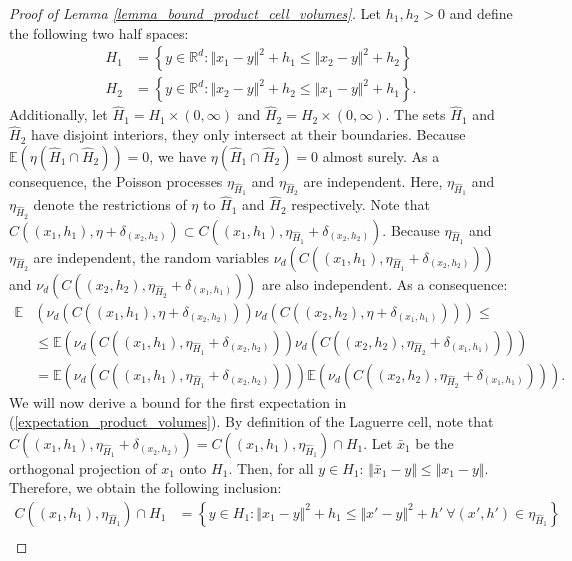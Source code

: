 \documentclass[10pt,a4paper]{amsart}
\newcommand{\EE}{\mathbb{E}}
\newcommand{\RR}{\mathbb{R}}
\begin{document}
\begin{proof}[Proof of Lemma \ref{lemma_bound_product_cell_volumes}]
    Let $h_1,h_2 > 0$ and define the following two half spaces:
    \begin{align*}
        H_1 &= \left\{y \in \RR^d: \Vert x_1 - y \Vert^2 + h_1 \leq \Vert x_2 - y\Vert^2 + h_2 \right\}\\
        H_2 &= \left\{y \in \RR^d: \Vert x_2 - y \Vert^2 + h_2 \leq \Vert x_1 - y\Vert^2 + h_1 \right\}.
    \end{align*}
    Additionally, let $\hat{H}_1 = H_1 \times (0,\infty)$ and $\hat{H}_2 = H_2 \times (0,\infty)$. The sets $\hat{H}_1$ and $\hat{H}_2$ have disjoint interiors, they only intersect at their boundaries. Because $\EE(\eta(\hat{H}_1 \cap \hat{H}_2)) = 0$, we have $\eta(\hat{H}_1 \cap \hat{H}_2) = 0$ almost surely. As a consequence, the Poisson processes $\eta_{\hat{H}_1}$ and $\eta_{\hat{H}_2}$ are independent. Here, $\eta_{\hat{H}_1}$ and $\eta_{\hat{H}_2}$ denote the restrictions of $\eta$ to $\hat{H}_1$ and $\hat{H}_2$ respectively. Note that $C((x_1,h_1),\eta+\delta_{(x_2,h_2)}) \subset C((x_1,h_1),\eta_{\hat{H}_1}+\delta_{(x_2,h_2)})$. Because $\eta_{\hat{H}_1}$ and $\eta_{\hat{H}_2}$ are independent, the random variables $\nu_d(C((x_1,h_1),\eta_{\hat{H}_1}+\delta_{(x_2,h_2)}))$ and $\nu_d(C((x_2,h_2),\eta_{\hat{H}_2}+\delta_{(x_1,h_1)}))$ are also independent. As a consequence:
    \begin{align}
        \EE&\left(\nu_d(C((x_1,h_1),\eta+\delta_{(x_2,h_2)}))\nu_d(C((x_2,h_2),\eta+\delta_{(x_1,h_1)})) \right) \leq \nonumber \\
        &\leq \EE\left(\nu_d(C((x_1,h_1),\eta_{\hat{H}_1}+\delta_{(x_2,h_2)}))\nu_d(C((x_2,h_2),\eta_{\hat{H}_2}+\delta_{(x_1,h_1)})) \right) \nonumber \\
        &= \EE\left(\nu_d(C((x_1,h_1),\eta_{\hat{H}_1}+\delta_{(x_2,h_2)}))\right)\EE\left(\nu_d(C((x_2,h_2),\eta_{\hat{H}_2}+\delta_{(x_1,h_1)})) \right). \label{expectation_product_volumes}
    \end{align}
    We will now derive a bound for the first expectation in (\ref{expectation_product_volumes}). By definition of the Laguerre cell, note that $C((x_1,h_1),\eta_{\hat{H}_1}+\delta_{(x_2,h_2)}) = C((x_1,h_1),\eta_{\hat{H}_1}) \cap H_1$. Let $\bar{x}_1$ be the orthogonal projection of $x_1$ onto $H_1$. Then, for all $y \in H_1$: $\Vert \bar{x}_1 - y\Vert \leq \Vert x_1 - y\Vert$. Therefore, we obtain the following inclusion:
    \begin{align}
        C\left((x_1,h_1),\eta_{\hat{H}_1}\right) \cap H_1 &= \left\{y \in H_1: \Vert x_1 - y\Vert^2 + h_1 \leq  \Vert x' - y\Vert^2 + h' \ \forall (x',h') \in \eta_{\hat{H}_1} \right\} \nonumber\\

\end{align}
\end{proof}
\end{document}
